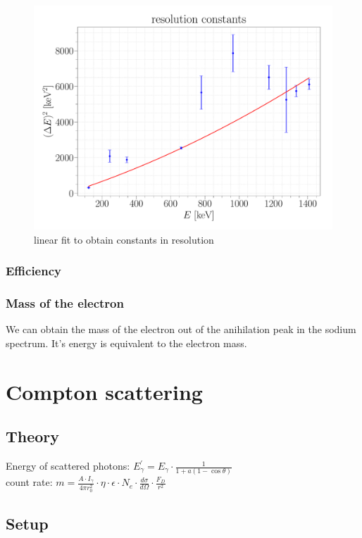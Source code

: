 \documentclass[a4paper,12pt]{article}
\begin{document}
\begin{figure}
\center
\includegraphics[scale=0.3]{../Figures/resolution constants.pdf}
\caption{linear fit to obtain constants in resolution}
\label{resolutionFit}
\end{figure}
\newpage

\subsubsection{Efficiency}

\subsubsection{Mass of the electron}
We can obtain the mass of the electron out of the anihilation peak in the sodium spectrum. It's energy is equivalent to the electron mass. 

\section{Compton scattering}

\subsection{Theory}
Energy of scattered photons: $E_\gamma^\prime = E_\gamma \cdot \frac{1}{1+a(1-\cos\theta)}$\\
count rate: $m = \frac{A \cdot I_\gamma}{4 \pi r_0^2} \cdot \eta \cdot \epsilon \cdot N_e \cdot \frac{d\sigma}{d\Omega} \cdot \frac{F_D}{r^2}$

\subsection{Setup}
\end{document}
